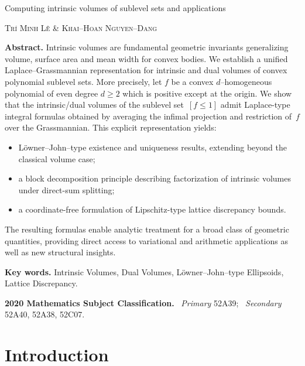 \documentclass[11pt]{article}
\theoremstyle{definition}
\numberwithin{equation}{section}
\begin{document}
\begin{center}
{\LARGE Computing intrinsic volumes of sublevel sets and applications}
\end{center}
\smallskip
\begin{center}
{\Large \textsc{Tr\'i Minh L\^e \& Khai--Hoan Nguyen--Dang}}
\end{center}


\bigskip

\noindent\textbf{Abstract.} 
Intrinsic volumes are fundamental geometric invariants generalizing volume, surface area and mean width for convex bodies.
We establish a unified Laplace--Grassmannian representation for intrinsic and dual volumes of convex polynomial sublevel sets. 
More precisely, let $f$ be a convex $d$--homogeneous polynomial of even degree $d \geq 2$ which is positive except at the origin.
We show that the intrinsic/dual volumes of the sublevel set~$[f \le 1]$ admit Laplace-type integral formulas obtained by averaging the infimal projection and restriction of~$f$ over the Grassmannian. 
This explicit representation yields:
\begin{itemize}
    \item[(i)] L\"owner--John--type existence and uniqueness results, extending beyond the classical volume case; 
    \item[(ii)]  a block decomposition principle describing factorization of intrinsic volumes under direct-sum splitting;
    \item[(iii)] a coordinate-free formulation of Lipschitz-type lattice discrepancy bounds. 
\end{itemize}
The resulting formulas enable analytic treatment for a broad class of geometric quantities, providing direct access to variational and arithmetic applications as well as new structural insights.

\bigskip


\noindent\textbf{Key words.} Intrinsic Volumes, Dual Volumes, L\"owner--John--type Ellipsoids, Lattice Discrepancy.
\vspace{0.6cm}

\noindent\textbf{2020 Mathematics Subject Classification.} \ \textit{Primary} 52A39; \ \textit{Secondary} 52A40, 52A38, 52C07.



\section{Introduction}\label{sec:intro}
\end{document}
